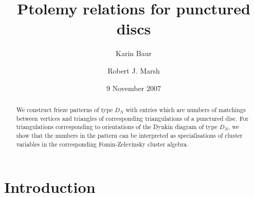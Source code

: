 \documentclass[a4paper]{amsart}
\begin{document}
\newtheorem{lemma}{Lemma}[section]
\newtheorem{prop}[lemma]{Proposition}
\newtheorem{cor}[lemma]{Corollary}
\newtheorem{theorem}[lemma]{Theorem}
\newtheorem{example}[lemma]{Example}
\newtheorem{conjecture}[lemma]{Conjecture}

\theoremstyle{definition}
\newtheorem{remark}[lemma]{Remark}
\newtheorem{definition}[lemma]{Definition}

\title[Ptolemy relations for punctured discs]{Ptolemy relations for
punctured discs}

\date{9 November 2007}

\author[Baur]{Karin Baur}
\address{Department of Mathematics \\
ETH Z\"urich \\
R\"amistrasse 101 \\
8092 Z\"urich \\
Switzerland
}

\author[Marsh]{Robert J. Marsh}
\address{Department of Pure Mathematics \\
University of Leeds \\
Leeds LS2 9JT \\
England
}


\begin{abstract}
We construct frieze patterns of type $D_N$ with entries which are
numbers of matchings between vertices and triangles of corresponding
triangulations of a punctured disc. For triangulations corresponding to
orientations of the Dynkin diagram of type $D_N$, we show that the numbers
in the pattern can be interpreted as specialisations of cluster variables
in the corresponding Fomin-Zelevinsky cluster algebra.
\end{abstract}

\maketitle

\section{Introduction}
\label{sec:introduction}
\end{document}
